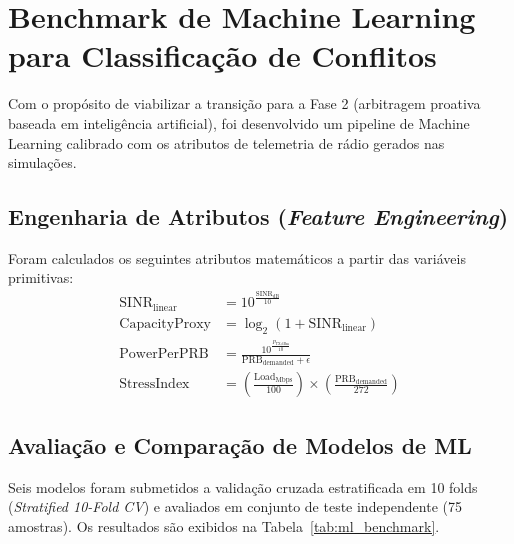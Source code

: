 \documentclass[10pt,journal,compsoc,a4paper]{IEEEtran}
\begin{document}
\section{Benchmark de Machine Learning para Classificação de Conflitos}
Com o propósito de viabilizar a transição para a Fase 2 (arbitragem proativa baseada em inteligência artificial), foi desenvolvido um pipeline de Machine Learning calibrado com os atributos de telemetria de rádio gerados nas simulações. 

\subsection{Engenharia de Atributos (\textit{Feature Engineering})}
Foram calculados os seguintes atributos matemáticos a partir das variáveis primitivas:
\begin{align}
\text{SINR}_{\text{linear}} &= 10^{\frac{\text{SINR}_{\text{dB}}}{10}} \\
\text{CapacityProxy} &= \log_2(1 + \text{SINR}_{\text{linear}}) \\
\text{PowerPerPRB} &= \frac{10^{\frac{P_{\text{TX,dBm}}}{10}}}{\text{PRB}_{\text{demanded}} + \epsilon} \\
\text{StressIndex} &= \left(\frac{\text{Load}_{\text{Mbps}}}{100}\right) \times \left(\frac{\text{PRB}_{\text{demanded}}}{272}\right)
\end{align}

\subsection{Avaliação e Comparação de Modelos de ML}
Seis modelos foram submetidos a validação cruzada estratificada em 10 folds (\textit{Stratified 10-Fold CV}) e avaliados em conjunto de teste independente (75 amostras). Os resultados são exibidos na Tabela~\ref{tab:ml_benchmark}.
\end{document}
